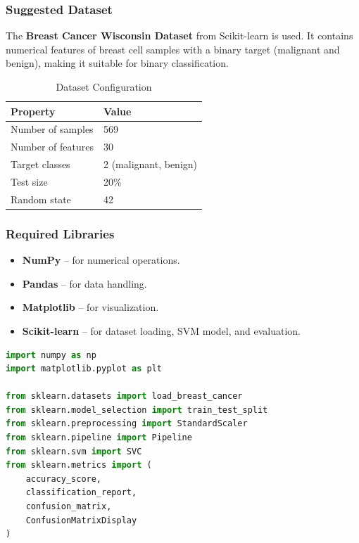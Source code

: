 \documentclass[a4paper,11pt]{article}
\begin{document}
\begin{itemize}
\subsubsection{Suggested Dataset}
The \textbf{Breast Cancer Wisconsin Dataset} from Scikit-learn is used. It contains numerical features of breast cell samples with a binary target (malignant and benign), making it suitable for binary classification.

\begin{table}[H]
\centering
\caption{Dataset Configuration}
\begin{tabular}{ll}
\toprule
\textbf{Property} & \textbf{Value} \\
\midrule
Number of samples  & 569 \\
Number of features & 30 \\
Target classes     & 2 (malignant, benign) \\
Test size          & 20\% \\
Random state       & 42 \\
\bottomrule
\end{tabular}
\end{table}

\subsubsection{Required Libraries}
\begin{itemize}
    \item \textbf{NumPy} -- for numerical operations.
    \item \textbf{Pandas} -- for data handling.
    \item \textbf{Matplotlib} -- for visualization.
    \item \textbf{Scikit-learn} -- for dataset loading, SVM model, and evaluation.
\end{itemize}

\begin{lstlisting}[language=Python, caption={Required Imports}]
import numpy as np
import matplotlib.pyplot as plt

from sklearn.datasets import load_breast_cancer
from sklearn.model_selection import train_test_split
from sklearn.preprocessing import StandardScaler
from sklearn.pipeline import Pipeline
from sklearn.svm import SVC
from sklearn.metrics import (
    accuracy_score,
    classification_report,
    confusion_matrix,
    ConfusionMatrixDisplay
)
\end{lstlisting}


\end{itemize}
\end{document}
